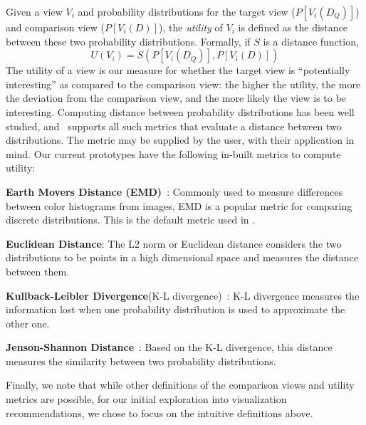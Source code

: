 Given a view $V_i$ and probability distributions for the
target view  ($P[V_i (D_Q)]$) and comparison view ($P[V_i (D)]$), the
{\em utility} of $V_i$ is defined as the distance between these two probability
distributions. Formally, if $S$ is a distance function,
$$ U (V_i) = S ( P[V_i (D_Q)], P[V_i (D)] )$$
The utility of a view is our measure for whether the target view is
``potentially interesting'' as compared to the comparison view:
the higher the utility, the more the deviation
from the comparison view, and the more likely the view is to be interesting.
Computing distance between probability distributions has
been well studied, and \VizRecDB\ supports all such
metrics that evaluate a distance between two distributions.
The metric may be supplied by the user, with their
application in mind.
Our current prototypes have the following in-built metrics
to compute utility:
\begin{denselist}
  \item {\bf Earth Movers Distance (EMD)}~\cite{wikipedia-prob-dist}: Commonly used to
  measure differences between color histograms from images, EMD is a popular metric for comparing
  discrete distributions. This is the default metric used in \VizRecDB.
  \item {\bf Euclidean Distance}: The L2 norm or
  Euclidean distance considers the two distributions to be points in a high
  dimensional space and measures the distance between them.
  \item {\bf Kullback-Leibler Divergence}(K-L divergence)~\cite{wikipedia-KL}:
  K-L divergence measures the information lost when one probability distribution is used to approximate
  the other one.
  \item {\bf Jenson-Shannon Distance}~\cite{wikipedia-JS,entropy-vis}: Based on
  the K-L divergence, this distance measures the similarity between two probability distributions.
\end{denselist}
Finally, we note that while other definitions of the comparison views and
utility metrics are possible, for our initial exploration into 
visualization recommendations, we chose to focus on the intuitive definitions above.
